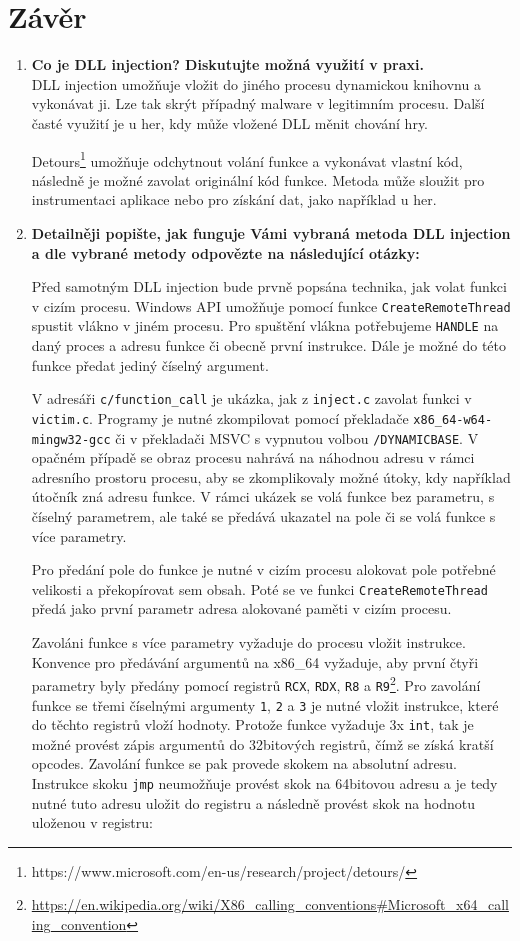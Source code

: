 \documentclass[12pt,a4paper]{article}
\begin{document}
\section{Závěr}
\begin{enumerate}
	\item \textbf{Co je DLL injection? Diskutujte možná využití v praxi.} \\
	DLL injection umožňuje vložit do jiného procesu dynamickou knihovnu a vykonávat ji.
	Lze tak skrýt případný malware v legitimním procesu.
	Další časté využití je u her, kdy může vložené DLL měnit chování hry.
	
	Detours\footnote{https://www.microsoft.com/en-us/research/project/detours/} umožňuje odchytnout volání funkce a vykonávat vlastní kód, následně je možné zavolat originální kód funkce.
	Metoda může sloužit pro instrumentaci aplikace nebo pro získání dat, jako například u her.
	
	
	\item \textbf{Detailněji popište, jak funguje Vámi vybraná metoda DLL injection a dle vybrané metody odpovězte na následující otázky:}
	
	Před samotným DLL injection bude prvně popsána technika, jak volat funkci v cizím procesu.
	Windows API umožňuje pomocí funkce \texttt{CreateRemoteThread} spustit vlákno v jiném procesu.
	Pro spuštění vlákna potřebujeme \texttt{HANDLE} na daný proces a adresu funkce či obecně první instrukce.
	Dále je možné do této funkce předat jediný číselný argument.
	
	V adresáři \texttt{c/function\_call} je ukázka, jak z \texttt{inject.c} zavolat funkci v \texttt{victim.c}.
	Programy je nutné zkompilovat pomocí překladače \texttt{x86\_64-w64-mingw32-gcc} či v překladači MSVC s vypnutou volbou \texttt{/DYNAMICBASE}.
	V opačném případě se obraz procesu nahrává na náhodnou adresu v rámci adresního prostoru procesu, aby se zkomplikovaly možné útoky, kdy například útočník zná adresu funkce.
	V rámci ukázek se volá funkce bez parametru, s číselný parametrem, ale také se předává ukazatel na pole či se volá funkce s více parametry.
	
	Pro předání pole do funkce je nutné v cizím procesu alokovat pole potřebné velikosti a překopírovat sem obsah.
	Poté se ve funkci \texttt{CreateRemoteThread} předá jako první parametr adresa alokované paměti v cizím procesu.
	
	Zavoláni funkce s více parametry vyžaduje do procesu vložit instrukce.
	Konvence pro předávání argumentů na x86\_64 vyžaduje, aby první čtyři parametry byly předány pomocí registrů \texttt{RCX}, \texttt{RDX}, \texttt{R8} a \texttt{R9}\footnote{\url{https://en.wikipedia.org/wiki/X86_calling_conventions\#Microsoft_x64_calling_convention}}.
	Pro zavolání funkce se třemi číselnými argumenty \texttt{1}, \texttt{2} a \texttt{3} je nutné vložit instrukce, které do těchto registrů vloží hodnoty.
	Protože funkce vyžaduje 3x \texttt{int}, tak je možné provést zápis argumentů do 32bitových registrů, čímž se získá kratší opcodes.
	Zavolání funkce se pak provede skokem na absolutní adresu.
	Instrukce skoku \texttt{jmp} neumožňuje provést skok na 64bitovou adresu a je tedy nutné tuto adresu uložit do registru a následně provést skok na hodnotu uloženou v registru: 
	

\end{enumerate}
\end{document}
